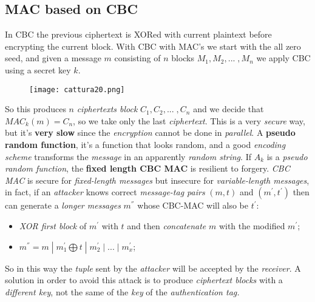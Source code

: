 \documentclass{article}
\begin{document}
\subsection{MAC based on CBC}
In CBC the previous ciphertext is XORed with current plaintext before encrypting the current block. With CBC with MAC's we start with the all zero seed, and given a message $m$ consisting of $n$ blocks $M_1, M_2, ...\;, M_n$ we apply CBC using a secret key $k$. 
\begin{figure}[H]
  \centering
  \texttt{[image: cattura20.png]}
\end{figure}
So this produces $n$ \emph{ciphertexts block} $C_1, C_2, ... \;, C_n$ and we decide that $MAC_k(m)= C_n$, so we take only the last \emph{ciphertext}. This is a very \emph{secure} way, but it's\textbf{ very slow} since the \emph{encryption} cannot be done in \emph{parallel}. A \textbf{pseudo random function}, it's a function that looks random, and a good \emph{encoding scheme} transforms the \emph{message} in an apparently \emph{random string}. If $A_k$ is a \emph{pseudo random function}, the \textbf{fixed length CBC MAC} is resilient to forgery. \emph{CBC MAC} is secure for \emph{fixed-length messages} but insecure for \emph{variable-length messages}, in fact, if an \emph{attacker} knows correct \emph{message-tag pairs} $(m,t)$ and $(m^{'},t^{'})$ then can generate a \emph{longer messages} $m^{''}$ whose CBC-MAC will also be $t^{'}$:
\begin{itemize}
\item \emph{XOR first block} of $m^{'}$ with $t$ and then \emph{concatenate} $m$ with the modified $m^{'}$;
\item $m^{''} = m\; |\; m^{'}_1 \bigoplus t \;|\; m^{'}_2 \;|\; ... \; |\; m_x^{'}$;
\end{itemize}
So in this way the \emph{tuple} sent by the \emph{attacker} will be accepted by the \emph{receiver}. A solution in order to avoid this attack is to produce \emph{ciphertext blocks} with a \emph{different key}, not the same of the \emph{key} of the \emph{authentication tag.} 
\end{document}
